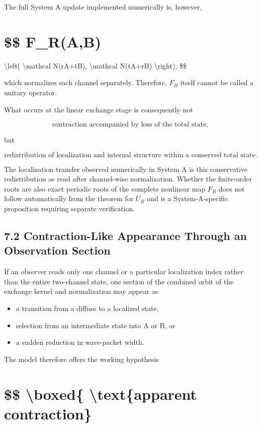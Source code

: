 \documentclass[
  a4paper,
  10pt]{article}
\providecommand{\tightlist}{%
  \setlength{\itemsep}{0pt}\setlength{\parskip}{0pt}}
\begin{document}
The full System A update implemented numerically is, however,

\section{\$\$ F\_R(A,B)}\label{-f_rab}

\textbackslash left( \textbackslash mathcal N(rA+tB),
\textbackslash mathcal N(tA+rB) \textbackslash right), \$\$

which normalizes each channel separately. Therefore, \(F_R\) itself
cannot be called a unitary operator.

What occurs at the linear exchange stage is consequently not

\[
\text{contraction accompanied by loss of the total state},
\]

but

\[
\text{redistribution of localization and internal structure within a conserved total state}.
\]

The localization transfer observed numerically in System A is this
conservative redistribution as read after channel-wise normalization.
Whether the finite-order roots are also exact periodic roots of the
complete nonlinear map \(F_R\) does not follow automatically from the
theorem for \(U_R\) and is a System-A-specific proposition requiring
separate verification.

\subsection{7.2 Contraction-Like Appearance Through an Observation
Section}\label{72-contraction-like-appearance-through-an-observation-section}

If an observer reads only one channel or a particular localization index
rather than the entire two-channel state, one section of the combined
orbit of the exchange kernel and normalization may appear as

\begin{itemize}
\tightlist
\item
  a transition from a diffuse to a localized state,
\item
  selection from an intermediate state into A or B, or
\item
  a sudden reduction in wave-packet width.
\end{itemize}

The model therefore offers the working hypothesis

\section{\$\$ \textbackslash boxed\{ \textbackslash text\{apparent
contraction\}}\label{-boxed-textapparent-contraction}
\end{document}
